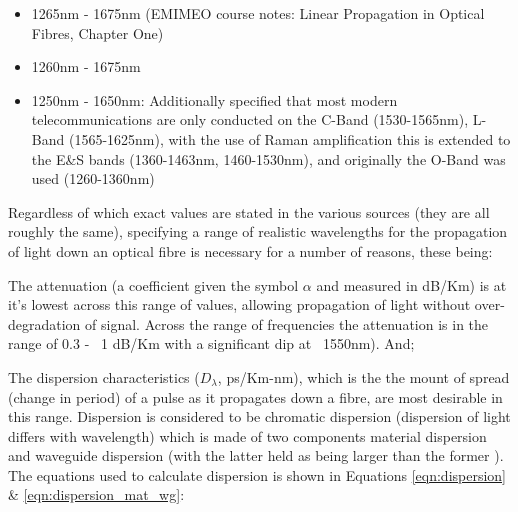 \documentclass[colorlinks,11pt,a4paper,normalphoto,withhyper,ragged2e]{altareport}
\begin{document}
\smallskip

\begin{itemize}[leftmargin=1cm]
	\item 1265nm - 1675nm (EMIMEO course notes: Linear Propagation in Optical Fibres, Chapter One)
	\item 1260nm - 1675nm \cite{fund_of_photonics}
	\item 1250nm - 1650nm: Additionally specified that most modern telecommunications are only conducted on the C-Band (1530-1565nm), L-Band (1565-1625nm), with the use of Raman amplification this is extended to the E\&S bands (1360-1463nm, 1460-1530nm), and originally the O-Band was used (1260-1360nm) \cite{adv_fiber_optics}
\end{itemize}


Regardless of which exact values are stated in the various sources (they are all roughly the same), specifying a range of realistic wavelengths for the propagation of light down an optical fibre is necessary for a number of reasons, these being: \linebreak

The attenuation (a coefficient given the symbol $\alpha$ and measured in dB/Km) is at it's lowest across this range of values, allowing propagation of light without over-degradation of signal. Across the range of frequencies the attenuation is in the range of 0.3 - ~1 dB/Km with a significant dip at ~1550nm). And; \linebreak

The dispersion characteristics ($D_{\lambda}$, ps/Km-nm), which is the the mount of spread (change in period) of a pulse as it propagates down a fibre, are most desirable in this range. 
Dispersion is considered to be chromatic dispersion (dispersion of light differs with wavelength) which is made of two components material dispersion and waveguide dispersion (with the latter held as being larger than the former \cite{fund_of_photonics}). The equations used to calculate dispersion is shown in Equations \ref{eqn:dispersion} \& \ref{eqn:dispersion_mat_wg}:


\end{document}
